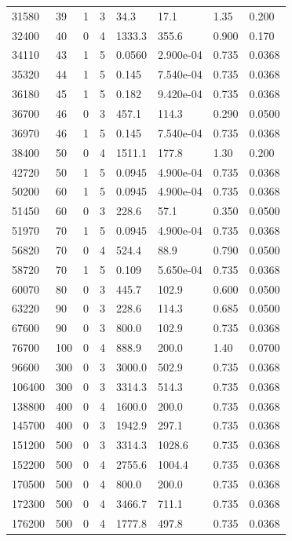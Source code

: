 \documentclass[preview]{standalone}
\begin{document}
{{\begin{tabular}{L{1.2cm}C{1.2cm} C{0.3cm}C{0.5cm} C{1.4cm}C{1.4cm} C{1.4cm}C{1.4cm}}
  31580  &    39  & 1     &  3 &  34.3  & 17.1  & 1.35 &  0.200   \\ 
  32400  &    40  & 0     &  4 &  1333.3  & 355.6  & 0.900 &  0.170   \\ 
  34110  &    43  & 1     &  5 &  0.0560  & 2.900e-04  & 0.735 &  0.0368   \\ 
  35320  &    44  & 1     &  5 &  0.145  & 7.540e-04  & 0.735 &  0.0368   \\ 
  36180  &    45  & 1     &  5 &  0.182  & 9.420e-04  & 0.735 &  0.0368   \\ 
  36700  &    46  & 0     &  3 &  457.1  & 114.3  & 0.290 &  0.0500   \\ 
  36970  &    46  & 1     &  5 &  0.145  & 7.540e-04  & 0.735 &  0.0368   \\ 
  38400  &    50  & 0     &  4 &  1511.1  & 177.8  & 1.30 &  0.200   \\ 
  42720  &    50  & 1     &  5 &  0.0945  & 4.900e-04  & 0.735 &  0.0368   \\ 
  50200  &    60  & 1     &  5 &  0.0945  & 4.900e-04  & 0.735 &  0.0368   \\ 
  51450  &    60  & 0     &  3 &  228.6  & 57.1  & 0.350 &  0.0500   \\ 
  51970  &    70  & 1     &  5 &  0.0945  & 4.900e-04  & 0.735 &  0.0368   \\ 
  56820  &    70  & 0     &  4 &  524.4  & 88.9  & 0.790 &  0.0500   \\ 
  58720  &    70  & 1     &  5 &  0.109  & 5.650e-04  & 0.735 &  0.0368   \\ 
  60070  &    80  & 0     &  3 &  445.7  & 102.9  & 0.600 &  0.0500   \\ 
  63220  &    90  & 0     &  3 &  228.6  & 114.3  & 0.685 &  0.0500   \\ 
  67600  &    90  & 0     &  3 &  800.0  & 102.9  & 0.735 &  0.0368   \\ 
  76700  &   100  & 0     &  4 &  888.9  & 200.0  & 1.40 &  0.0700   \\ 
  96600  &   300  & 0     &  3 &  3000.0  & 502.9  & 0.735 &  0.0368   \\ 
  106400  &   300  & 0     &  3 &  3314.3  & 514.3  & 0.735 &  0.0368   \\ 
  138800  &   400  & 0     &  4 &  1600.0  & 200.0  & 0.735 &  0.0368   \\ 
  145700  &   400  & 0     &  3 &  1942.9  & 297.1  & 0.735 &  0.0368   \\ 
  151200  &   500  & 0     &  3 &  3314.3  & 1028.6  & 0.735 &  0.0368   \\ 
  152200  &   500  & 0     &  4 &  2755.6  & 1004.4  & 0.735 &  0.0368   \\ 
  170500  &   500  & 0     &  4 &  800.0  & 200.0  & 0.735 &  0.0368   \\ 
  172300  &   500  & 0     &  4 &  3466.7  & 711.1  & 0.735 &  0.0368   \\ 
  176200  &   500  & 0     &  4 &  1777.8  & 497.8  & 0.735 &  0.0368   \\ 
\hline 
\end{tabular} 

}}
\end{document}
